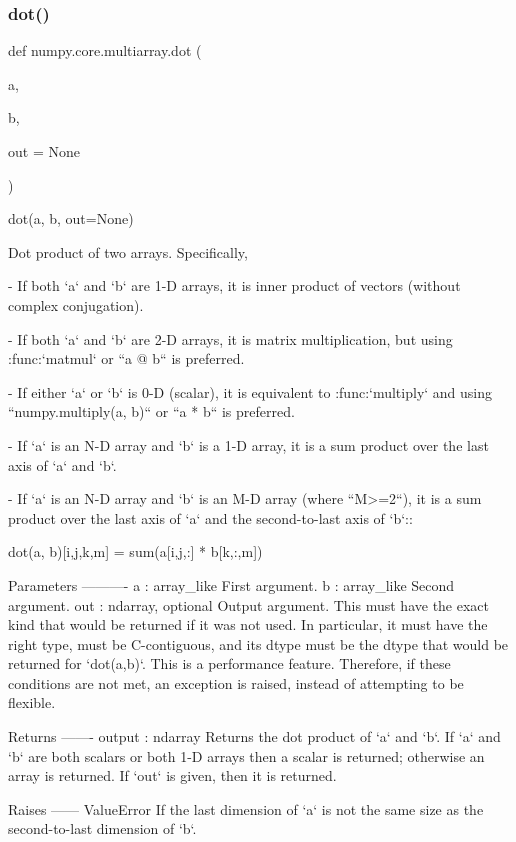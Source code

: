 \subsubsection{\texorpdfstring{dot()}{dot()}}
{\footnotesize\ttfamily def numpy.\+core.\+multiarray.\+dot (\begin{DoxyParamCaption}\item[{}]{a,  }\item[{}]{b,  }\item[{}]{out = {\ttfamily None} }\end{DoxyParamCaption})}

\begin{DoxyVerb}dot(a, b, out=None)

Dot product of two arrays. Specifically,

- If both `a` and `b` are 1-D arrays, it is inner product of vectors
  (without complex conjugation).

- If both `a` and `b` are 2-D arrays, it is matrix multiplication,
  but using :func:`matmul` or ``a @ b`` is preferred.

- If either `a` or `b` is 0-D (scalar), it is equivalent to :func:`multiply`
  and using ``numpy.multiply(a, b)`` or ``a * b`` is preferred.

- If `a` is an N-D array and `b` is a 1-D array, it is a sum product over
  the last axis of `a` and `b`.

- If `a` is an N-D array and `b` is an M-D array (where ``M>=2``), it is a
  sum product over the last axis of `a` and the second-to-last axis of `b`::

    dot(a, b)[i,j,k,m] = sum(a[i,j,:] * b[k,:,m])

Parameters
----------
a : array_like
    First argument.
b : array_like
    Second argument.
out : ndarray, optional
    Output argument. This must have the exact kind that would be returned
    if it was not used. In particular, it must have the right type, must be
    C-contiguous, and its dtype must be the dtype that would be returned
    for `dot(a,b)`. This is a performance feature. Therefore, if these
    conditions are not met, an exception is raised, instead of attempting
    to be flexible.

Returns
-------
output : ndarray
    Returns the dot product of `a` and `b`.  If `a` and `b` are both
    scalars or both 1-D arrays then a scalar is returned; otherwise
    an array is returned.
    If `out` is given, then it is returned.

Raises
------
ValueError
    If the last dimension of `a` is not the same size as
    the second-to-last dimension of `b`.


\end{DoxyVerb}
